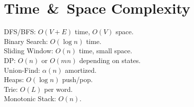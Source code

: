 \documentclass[11pt]{article}
\begin{document}
\section{Time \,\& \,Space Complexity}
\begin{tcolorbox}[colback=codebg,colframe=black!60,title=Summary]
  DFS/BFS: $O(V+E)$ time, $O(V)$ space. \\
  Binary Search: $O(\log n)$ time. \\
  Sliding Window: $O(n)$ time, small space. \\
  DP: $O(n)$ or $O(mn)$ depending on states. \\
  Union-Find: $\alpha(n)$ amortized. \\
  Heaps: $O(\log n)$ push/pop. \\
  Trie: $O(L)$ per word. \\
  Monotonic Stack: $O(n)$.
\end{tcolorbox}

\end{document}
